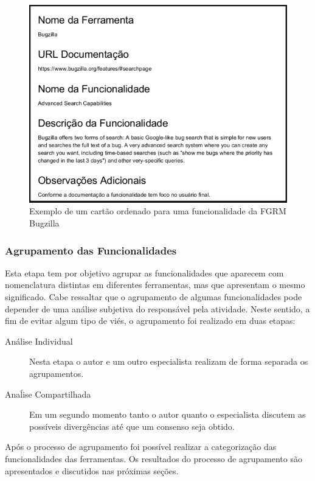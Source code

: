\begin{figure}[htpb]
	\centering
	\includegraphics[width=0.9\linewidth]{./chapter-estudo-funcionalidades-fgrm/img/exemplo_cartao_ordenado.png}
	\caption{Exemplo de um cartão ordenado para uma funcionalidade da FGRM
		Bugzilla}
\label{fig:exemplo_cartao_ordenado}
\end{figure}

\subsubsection{Agrupamento das Funcionalidades}
\label{subsec:agrupamento_fucionalidades}

Esta etapa tem por objetivo agrupar as funcionalidades que aparecem com
nomenclatura distintas em diferentes ferramentas, mas que apresentam o mesmo
significado. Cabe ressaltar que o agrupamento de algumas funcionalidades pode
depender de uma análise subjetiva do responsável pela atividade. Neste sentido,
a fim de evitar algum tipo de viés, o agrupamento foi realizado em duas etapas:

\begin{description}
	\item[Análise Individual] Nesta etapa o autor e um outro especialista
		realizam de forma separada os agrupamentos.
	\item[Anaĺise Compartilhada] Em um segundo momento tanto o autor quanto o
		es\-pe\-ci\-a\-lis\-ta discutem as possíveis divergências até que um
		consenso seja obtido.
\end{description}

Após o processo de agrupamento foi possível realizar a categorização das
funcionalidades das ferramentas. Os resultados do processo de agrupamento são
apresentados e discutidos nas próximas seções.

